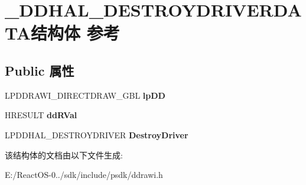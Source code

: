 \hypertarget{struct___d_d_h_a_l___d_e_s_t_r_o_y_d_r_i_v_e_r_d_a_t_a}{}\section{\+\_\+\+D\+D\+H\+A\+L\+\_\+\+D\+E\+S\+T\+R\+O\+Y\+D\+R\+I\+V\+E\+R\+D\+A\+T\+A结构体 参考}
\label{struct___d_d_h_a_l___d_e_s_t_r_o_y_d_r_i_v_e_r_d_a_t_a}
\subsection*{Public 属性}
\begin{DoxyCompactItemize}
\item 
\mbox{\label{struct___d_d_h_a_l___d_e_s_t_r_o_y_d_r_i_v_e_r_d_a_t_a_a7d5a46138abcd584c3f9c2aa91055a11}} 
L\+P\+D\+D\+R\+A\+W\+I\+\_\+\+D\+I\+R\+E\+C\+T\+D\+R\+A\+W\+\_\+\+G\+BL {\bfseries lp\+DD}
\item 
\mbox{\label{struct___d_d_h_a_l___d_e_s_t_r_o_y_d_r_i_v_e_r_d_a_t_a_af9f2d19c98bc1282f37ed8c229723a0e}} 
H\+R\+E\+S\+U\+LT {\bfseries dd\+R\+Val}
\item 
\mbox{\label{struct___d_d_h_a_l___d_e_s_t_r_o_y_d_r_i_v_e_r_d_a_t_a_a192b080c24d8ae234bbfe0e221cbf06a}} 
L\+P\+D\+D\+H\+A\+L\+\_\+\+D\+E\+S\+T\+R\+O\+Y\+D\+R\+I\+V\+ER {\bfseries Destroy\+Driver}
\end{DoxyCompactItemize}


该结构体的文档由以下文件生成\+:\begin{DoxyCompactItemize}
\item 
E\+:/\+React\+O\+S-\/0../sdk/include/psdk/ddrawi.\+h\end{DoxyCompactItemize}
